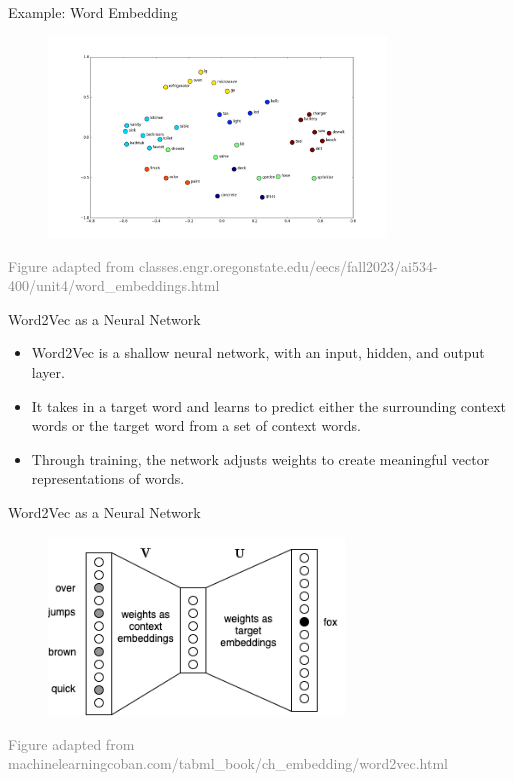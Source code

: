 \documentclass[serif, aspectratio=169]{beamer}
\begin{document}
\begin{frame}{Example: Word Embedding}
	\begin{figure}
		\centering
		\includegraphics[width=0.8\textwidth]{pic/word_embedding.png}
	\end{figure}
	\hspace{-1.0cm}
	{\tiny \textcolor{gray}{Figure adapted from classes.engr.oregonstate.edu/eecs/fall2023/ai534-400/unit4/word_embeddings.html}}
\end{frame}


\begin{frame}{Word2Vec as a Neural Network}
	 \begin{itemize} \item Word2Vec is a shallow neural network, with an input, hidden, and output layer. \item It takes in a target word and learns to predict either the surrounding context words or the target word from a set of context words. \item Through training, the network adjusts weights to create meaningful vector representations of words. 
	 \end{itemize} 
\end{frame}


\begin{frame}{Word2Vec as a Neural Network}
	\begin{figure}
		\centering
		\includegraphics[width=0.7\textwidth]{pic/word2vec_nn.png}
	\end{figure}
	\vspace{0.4cm}
	\hspace{-1.0cm}
	{\tiny \textcolor{gray}{Figure adapted from machinelearningcoban.com/tabml_book/ch_embedding/word2vec.html}}
\end{frame}
\end{document}
